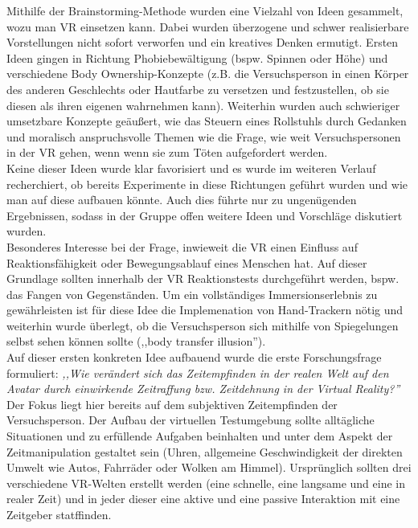 \documentclass{Bericht}
\begin{document}
Mithilfe der Brainstorming-Methode wurden eine Vielzahl von Ideen gesammelt, wozu man VR einsetzen kann. Dabei wurden überzogene und schwer realisierbare Vorstellungen nicht sofort verworfen und ein kreatives Denken ermutigt.
Ersten Ideen gingen in Richtung Phobiebewältigung (bspw. Spinnen oder Höhe) und verschiedene Body Ownership-Konzepte (z.B. die Versuchsperson in einen Körper des anderen Geschlechts oder Hautfarbe zu versetzen und festzustellen, ob sie diesen als ihren eigenen wahrnehmen kann). Weiterhin wurden auch schwieriger umsetzbare Konzepte geäußert, wie das Steuern eines Rollstuhls durch Gedanken und moralisch anspruchsvolle Themen wie die Frage, wie weit Versuchspersonen in der VR gehen, wenn
wenn sie zum Töten aufgefordert werden.\\
Keine dieser Ideen wurde klar favorisiert und es wurde im weiteren Verlauf recherchiert, ob bereits Experimente in diese Richtungen geführt wurden und wie man auf diese aufbauen könnte. Auch dies führte nur zu ungenügenden Ergebnissen, sodass in der Gruppe offen weitere Ideen und Vorschläge diskutiert wurden.\\
Besonderes Interesse bei der Frage, inwieweit die VR einen Einfluss auf Reaktionsfähigkeit oder Bewegungsablauf eines Menschen hat. Auf dieser Grundlage sollten innerhalb der VR Reaktionstests durchgeführt werden, bspw. das Fangen von Gegenständen. Um ein vollständiges Immersionserlebnis zu gewährleisten ist für diese Idee die Implemenation von Hand-Trackern nötig und weiterhin wurde überlegt, ob die Versuchsperson sich mithilfe von Spiegelungen selbst sehen können sollte (,,body transfer illusion'').\\
Auf dieser ersten konkreten Idee aufbauend wurde die erste Forschungsfrage formuliert:
\textit{,,Wie verändert sich das Zeitempfinden in der realen Welt auf den Avatar durch einwirkende Zeitraffung bzw. Zeitdehnung in der Virtual Reality?''}\\
	 Der Fokus liegt hier bereits auf dem subjektiven Zeitempfinden der Versuchsperson. Der Aufbau der virtuellen Testumgebung sollte alltägliche Situationen und zu erfüllende Aufgaben beinhalten und unter dem Aspekt der Zeitmanipulation gestaltet sein (Uhren, allgemeine Geschwindigkeit der direkten Umwelt wie Autos, Fahrräder oder Wolken am Himmel). 
Ursprünglich sollten drei verschiedene VR-Welten erstellt werden (eine schnelle, eine langsame und eine in realer Zeit) und in jeder dieser eine aktive und eine passive Interaktion mit eine Zeitgeber statffinden.
\end{document}

